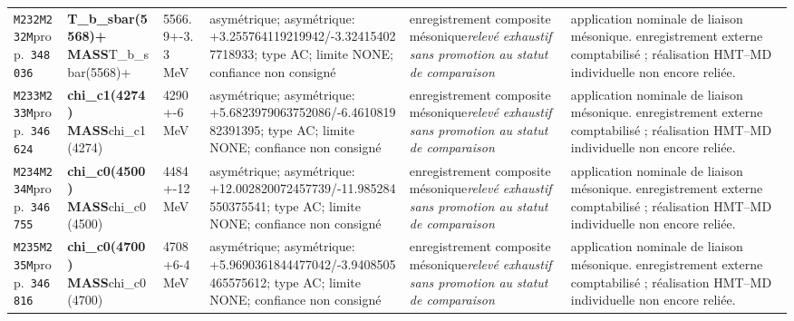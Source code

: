 \begin{landscape}
\begin{longtable}{L{1.85cm}L{4.45cm}L{2.35cm}L{4.05cm}L{3.35cm}L{7.15cm}}
\texttt{M232}\newline \texttt{M232M}\newline prop.\ \texttt{348036} & \textbf{T\_\allowbreak{}b\_\allowbreak{}sbar(5568)+ MASS}\newline T\_\allowbreak{}b\_\allowbreak{}sbar(5568)+ & 5566.9+-3.3\,MeV & asymétrique; asymétrique: +3.255764119219942/-3.324154027718933; type AC; limite NONE; confiance non consigné & enregistrement composite mésonique\newline \emph{relevé exhaustif sans promotion au statut de comparaison} & application nominale de liaison mésonique. enregistrement externe comptabilisé ; réalisation HMT--MD individuelle non encore reliée. \\
\texttt{M233}\newline \texttt{M233M}\newline prop.\ \texttt{346624} & \textbf{chi\_\allowbreak{}c1(4274) MASS}\newline chi\_\allowbreak{}c1(4274) & 4290+-6\,MeV & asymétrique; asymétrique: +5.6823979063752086/-6.461081982391395; type AC; limite NONE; confiance non consigné & enregistrement composite mésonique\newline \emph{relevé exhaustif sans promotion au statut de comparaison} & application nominale de liaison mésonique. enregistrement externe comptabilisé ; réalisation HMT--MD individuelle non encore reliée. \\
\texttt{M234}\newline \texttt{M234M}\newline prop.\ \texttt{346755} & \textbf{chi\_\allowbreak{}c0(4500) MASS}\newline chi\_\allowbreak{}c0(4500) & 4484+-12\,MeV & asymétrique; asymétrique: +12.002820072457739/-11.985284550375541; type AC; limite NONE; confiance non consigné & enregistrement composite mésonique\newline \emph{relevé exhaustif sans promotion au statut de comparaison} & application nominale de liaison mésonique. enregistrement externe comptabilisé ; réalisation HMT--MD individuelle non encore reliée. \\
\texttt{M235}\newline \texttt{M235M}\newline prop.\ \texttt{346816} & \textbf{chi\_\allowbreak{}c0(4700) MASS}\newline chi\_\allowbreak{}c0(4700) & 4708+6-4\,MeV & asymétrique; asymétrique: +5.9690361844477042/-3.9408505465575612; type AC; limite NONE; confiance non consigné & enregistrement composite mésonique\newline \emph{relevé exhaustif sans promotion au statut de comparaison} & application nominale de liaison mésonique. enregistrement externe comptabilisé ; réalisation HMT--MD individuelle non encore reliée. \\

\end{longtable}
\end{landscape}
